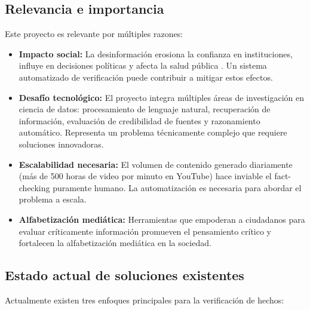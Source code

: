 \documentclass[12pt,a4paper]{article}
\begin{document}
\subsection{Relevancia e importancia}

Este proyecto es relevante por múltiples razones:

\begin{itemize}
    \item \textbf{Impacto social:} La desinformación erosiona la confianza en instituciones, influye en decisiones políticas y afecta la salud pública \citep{wardle2017information, benkler2018network}. Un sistema automatizado de verificación puede contribuir a mitigar estos efectos.

    \item \textbf{Desafío tecnológico:} El proyecto integra múltiples áreas de investigación en ciencia de datos: procesamiento de lenguaje natural, recuperación de información, evaluación de credibilidad de fuentes y razonamiento automático. Representa un problema técnicamente complejo que requiere soluciones innovadoras.

    \item \textbf{Escalabilidad necesaria:} El volumen de contenido generado diariamente (más de 500 horas de video por minuto en YouTube) hace inviable el fact-checking puramente humano. La automatización es necesaria para abordar el problema a escala.

    \item \textbf{Alfabetización mediática:} Herramientas que empoderan a ciudadanos para evaluar críticamente información promueven el pensamiento crítico y fortalecen la alfabetización mediática en la sociedad.
\end{itemize}

\subsection{Estado actual de soluciones existentes}

Actualmente existen tres enfoques principales para la verificación de hechos:
\end{document}
